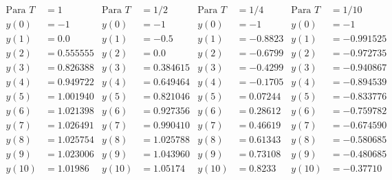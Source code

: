 \documentclass[10pt]{article}
\begin{document}
\begin{align*}
    \text{Para } T &= 1  & \text{Para } T &= 1/2  &  \text{Para } T &= 1/4   & \text{Para } T &= 1/10\\
    y(0) &= -1           & y(0) &= -1             &  y(0) &= -1              &  y(0) &= -1\\
    y(1) &= 0.0          & y(1) &= -0.5           &  y(1) &= -0.8823         &  y(1) &= -0.991525\\
    y(2) &= 0.555555     & y(2) &= 0.0            &  y(2) &= -0.6799         &  y(2) &= -0.972735\\
    y(3) &= 0.826388     & y(3) &= 0.384615       &  y(3) &= -0.4299         &  y(3) &= -0.940867\\
    y(4) &= 0.949722     & y(4) &= 0.649464       &  y(4) &= -0.1705         &  y(4) &= -0.894539\\
    y(5) &= 1.001940     & y(5) &= 0.821046       &  y(5) &= 0.07244         &  y(5) &= -0.833776\\
    y(6) &= 1.021398     & y(6) &= 0.927356       &  y(6) &= 0.28612         &  y(6) &= -0.759782\\
    y(7) &= 1.026491     & y(7) &= 0.990410       &  y(7) &= 0.46619         &  y(7) &= -0.674590\\
    y(8) &= 1.025754     & y(8) &= 1.025788       &  y(8) &= 0.61343         &  y(8) &= -0.580685\\
    y(9) &= 1.023006     & y(9) &= 1.043960       &  y(9) &= 0.73108         &  y(9) &= -0.480685\\
    y(10) &= 1.01986     & y(10) &= 1.05174       &  y(10) &= 0.8233         &  y(10) &= -0.37710\\
\end{align*}
\end{document}
